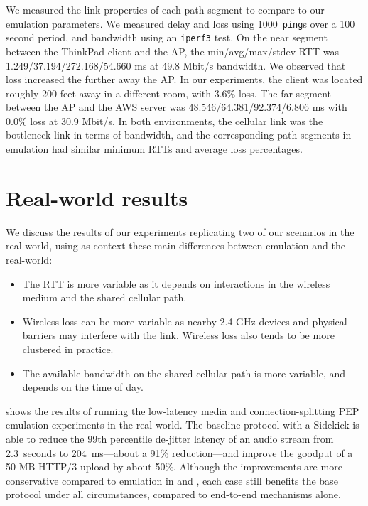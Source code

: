 We measured the link properties of each path segment to compare to
our emulation parameters. We measured delay and loss using 1000~\texttt{ping}s
over a 100 second period, and bandwidth using an \texttt{iperf3} test.
On the near segment between the ThinkPad client and the AP,
the min/avg/max/stdev RTT was 1.249/37.194/272.168/54.660 ms
at 49.8 Mbit/s bandwidth. We observed that loss increased
the further away the AP. In our experiments, the client was located roughly
200 feet away in a different room, with 3.6\% loss.
The far segment between the AP and the AWS server was
48.546/64.381/92.374/6.806 ms with 0.0\% loss at 30.9 Mbit/s.
In both environments, the cellular link was the bottleneck link in terms of
bandwidth, and the corresponding path segments in emulation had similar
minimum RTTs and average loss percentages.

\section{Real-world results}
\label{sec:sidekick:real-world}



We discuss the results of our experiments replicating two of our scenarios in
the real world, using as context
these main differences between emulation and the real-world:

\begin{itemize}[noitemsep,topsep=0pt]
  \item The RTT is more variable as it depends on interactions in the
  wireless medium and the shared cellular path.
  \item Wireless loss can be more variable as nearby 2.4 GHz devices and
  physical barriers may interfere with the link. Wireless loss also tends
  to be more clustered in practice.
  \item The available bandwidth on the shared cellular path is more variable,
  and depends on the time of day.
\end{itemize}

 shows the results of running the low-latency media and
connection-splitting PEP emulation experiments in the real-world. The baseline
protocol with a Sidekick is able to
reduce the 99th percentile de-jitter latency of an audio stream
from 2.3~seconds to 204~ms---about a 91\% reduction---and
improve the goodput of a 50 MB HTTP/3 upload by about 50\%.
Although the improvements are more conservative compared to emulation in
 and , each case still benefits the
base protocol under all circumstances, compared to end-to-end mechanisms alone.


